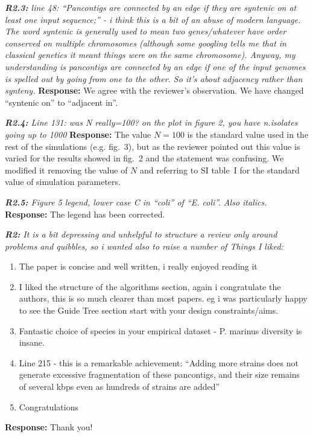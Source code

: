 \documentclass[aps,rmp,onecolumn]{revtex4-1}
\newcommand{\reviewer}[2]{{\it \textbf{#1:} #2\vskip 5mm}}
\newcommand{\response}[1]{{{\color{response}\textbf{Response:} #1}}\vskip 5mm}
\begin{document}
\reviewer{R2.3}{line 48: ``Pancontigs are connected by an edge if they are syntenic on at least one input sequence;'' - i think this is a bit of an abuse of modern language. The word syntenic is generally used to mean two genes/whatever have order conserved on multiple chromosomes (although some googling tells me that in classical genetics it meant things were on the same chromosome). Anyway, my understanding is pancontigs are connected by an edge if one of the input genomes is spelled out by going from one to the other. So it's about adjacency rather than synteny.}
\response{We agree with the reviewer's observation. We have changed ``syntenic on'' to ``adjacent in''.}

\reviewer{R2.4}{Line 131: was N really=100? on the plot in figure 2, you have n.isolates going up to 1000}
\response{The value $N=100$ is the standard value used in the rest of the simulations (e.g. fig.~3), but as the reviewer pointed out this value is varied for the results showed in fig.~2 and the statement was confusing. We modified it removing the value of $N$ and referring to SI table~I for the standard value of simulation parameters.}

\reviewer{R2.5}{Figure 5 legend, lower case C in ``coli'' of ``E. coli''. Also italics.}
\response{The legend has been corrected.}


\reviewer{R2}{It is a bit depressing and unhelpful to structure a review only around problems and quibbles, so i wanted also to raise a number of
      Things I liked:

      \begin{enumerate}
            \item The paper is concise and well written, i really enjoyed reading it
            \item I liked the structure of the algorithms section, again i congratulate the authors, this is so much clearer than most papers. eg i was particularly happy to see the Guide Tree section start with your design constraints/aims.
            \item Fantastic choice of species in your empirical dataset - P. marinus diversity is insane.
            \item Line 215 - this is a remarkable achievement: ``Adding more strains does not generate excessive fragmentation of these pancontigs, and their size remains of several kbps even as hundreds of strains are added''
            \item Congratulations
      \end{enumerate}
}
\response{Thank you!}
\end{document}
